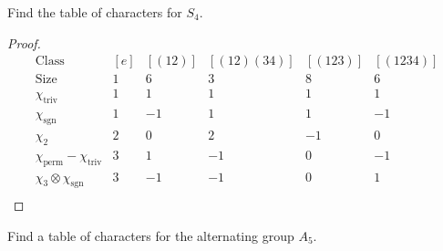 \begin{prob}[S2014-Q5]
    Find the table of characters for $S_4$.
\end{prob}
\begin{proof}
\begin{equation*}
    \begin{array}{c|ccccc}
        \text{Class} & [e] & [(12)] & [(12)(34)] & [(123)] & [(1234)] \\
        \text{Size} & 1 & 6 & 3 & 8 & 6 \\
        \hline
        \chi_{\text{triv}} & 1 & 1 & 1 & 1 & 1 \\
        \chi_{\text{sgn}} & 1 & -1 & 1 & 1 & -1 \\
        \chi_{2} & 2 & 0 & 2 & -1 & 0 \\
        \chi_{\text{perm}}-\chi_{\text{triv}} & 3 & 1 & -1 & 0 & -1 \\
        \chi_3\otimes\chi_{\text{sgn}} & 3 & -1 & -1 & 0 & 1 \\
        \end{array}
\end{equation*}

\end{proof}

\begin{prob}[F2016-Q6]
    Find a table of characters for the alternating group $A_5$.
\end{prob}



